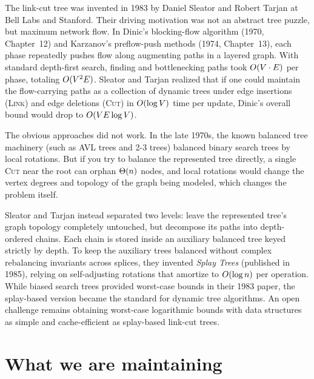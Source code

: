 \begin{historybox}
The link-cut tree was invented in 1983 by Daniel Sleator and Robert Tarjan at
Bell Labs and Stanford. Their driving motivation was not an abstract tree puzzle,
but maximum network flow. In Dinic's blocking-flow algorithm (1970, Chapter~12) and Karzanov's
preflow-push methods (1974, Chapter~13), each phase repeatedly pushes flow along augmenting paths
in a layered graph. With standard depth-first search, finding and bottlenecking paths
took $O(V \cdot E)$ per phase, totaling $O(V^2 E)$. Sleator and Tarjan realized
that if one could maintain the flow-carrying paths as a collection of dynamic trees
under edge insertions (\textsc{Link}) and edge deletions (\textsc{Cut}) in $O(\log V)$
time per update, Dinic's overall bound would drop to $O(V E \log V)$.

The obvious approaches did not work. In the late 1970s, the known balanced tree machinery
(such as AVL trees and 2-3 trees) balanced binary search trees by local rotations. But if you try
to balance the represented tree directly, a single \textsc{Cut} near the root can orphan
$\Theta(n)$ nodes, and local rotations would change the vertex degrees and topology of
the graph being modeled, which changes the problem itself.

Sleator and Tarjan instead separated two levels: leave the
represented tree's graph topology completely untouched, but decompose its paths into
depth-ordered chains. Each chain is stored inside an auxiliary balanced tree keyed
strictly by depth. To keep the auxiliary trees balanced without complex rebalancing
invariants across splices, they invented \emph{Splay Trees} (published in 1985),
relying on self-adjusting rotations that amortize to $O(\log n)$ per operation.
While biased search trees provided worst-case bounds in their 1983 paper, the splay-based
version became the standard for dynamic tree algorithms. An open challenge
remains obtaining worst-case logarithmic bounds with data structures as simple and
cache-efficient as splay-based link-cut trees.
\end{historybox}

\chapterline

\section{What we are maintaining}
\label{ch22:setup}


